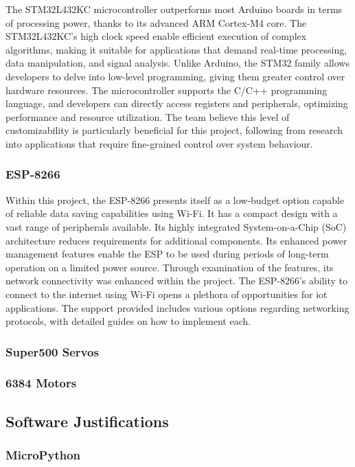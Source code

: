 \documentclass [12pt]{article}
\begin{document}
The STM32L432KC microcontroller outperforms most Arduino boards in terms of processing power, thanks to its advanced ARM Cortex-M4 core. The STM32L432KC's high clock speed enable efficient execution of complex algorithms, making it suitable for applications that demand real-time processing, data manipulation, and signal analysis. Unlike Arduino, the STM32 family allows developers to delve into low-level programming, giving them greater control over hardware resources. The microcontroller supports the C/C++ programming language, and developers can directly access registers and peripherals, optimizing performance and resource utilization. The team believe this level of customizability is particularly beneficial for this project, following from research into applications that require fine-grained control over system behaviour. 

\subsubsection{ESP-8266}
Within this project, the ESP-8266 presents itself as a low-budget option capable of reliable data saving capabilities using Wi-Fi. It has a compact design with a vast range of peripherals available. Its highly integrated System-on-a-Chip (SoC) architecture reduces requirements for additional components. Its enhanced power management features enable the ESP to be used during periods of long-term operation on a limited power source. Through examination of the features, its network connectivity was enhanced within the project. The ESP-8266’s ability to connect to the internet using Wi-Fi opens a plethora of opportunities for \gls{iot} applications. The support provided includes various options regarding networking protocols, with detailed guides on how to implement each.

\subsubsection{Super500 Servos}

\subsubsection{6384 Motors}

\subsection{Software Justifications}

\subsubsection{MicroPython}
\end{document}
